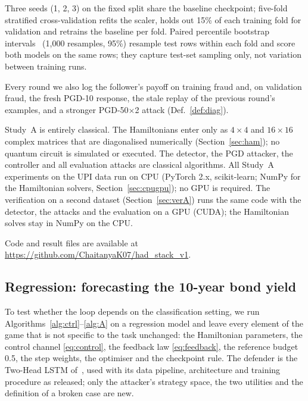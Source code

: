 \documentclass[conference]{IEEEtran}
\begin{document}
Three seeds (1, 2, 3) on the fixed split share the baseline checkpoint; five-fold stratified cross-validation refits the scaler, holds out 15\% of each training fold for validation and retrains the baseline per fold. Paired percentile bootstrap intervals~\cite{efron1993} (1,000 resamples, 95\%) resample test rows within each fold and score both models on the same rows; they capture test-set sampling only, not variation between training runs.

Every round we also log the follower's payoff on training fraud and, on validation fraud, the fresh PGD-10 response, the stale replay of the previous round's examples, and a stronger PGD-50$\times$2 attack (Def.~\ref{def:diag}).

\label{sec:hwA}Study~A is entirely classical. The Hamiltonians enter only as $4{\times}4$ and $16{\times}16$ complex matrices that are diagonalised numerically (Section~\ref{sec:ham}); no quantum circuit is simulated or executed. The detector, the PGD attacker, the controller and all evaluation attacks are classical algorithms. All Study~A experiments on the UPI data run on CPU (PyTorch 2.x, scikit-learn; NumPy for the Hamiltonian solvers, Section~\ref{sec:cpugpu}); no GPU is required. The verification on a second dataset (Section~\ref{sec:verA}) runs the same code with the detector, the attacks and the evaluation on a GPU (CUDA); the Hamiltonian solves stay in NumPy on the CPU.

Code and result files are available at \url{https://github.com/ChaitanyaK07/had_stack_v1}.

\subsection{Regression: forecasting the 10-year bond yield}\label{sec:regA}
To test whether the loop depends on the classification setting, we run Algorithms~\ref{alg:ctrl}--\ref{alg:A} on a regression model and leave every element of the game that is not specific to the task unchanged: the Hamiltonian parameters, the control channel \eqref{eq:control}, the feedback law \eqref{eq:feedback}, the reference budget 0.5, the step weights, the optimiser and the checkpoint rule. The defender is the Two-Head LSTM of~\cite{pilaka2026bond}, used with its data pipeline, architecture and training procedure as released; only the attacker's strategy space, the two utilities and the definition of a broken case are new.
\end{document}

